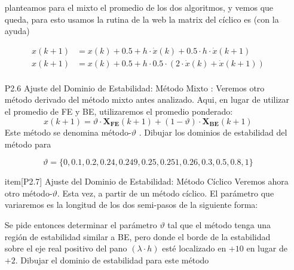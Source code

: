\documentclass{article}
\begin{document}
\begin{itemize}
planteamos para el mixto el promedio de los dos algoritmos, y vemos que queda, para esto usamos la rutina de la web
la matrix del cíclico es (con la ayuda)

\begin{align}
	x(k+1)   &=  x(k) + 0.5 + h \cdot \dot{x}(k) + 0.5 \cdot h \cdot \dot{x}(k+1) \\
	x(k+1)   &=  x(k) + 0.5 + h \cdot 0.5 \cdot (2 \cdot \dot{x}(k) +  \dot{x}(k+1)) \\
\end{align}
\item[P2.6] Ajuste del Dominio de Estabilidad: Método Mixto : Veremos otro método derivado del método mixto antes analizado. Aqui, en lugar de utilizar el promedio de FE y BE, utilizaremos el promedio ponderado:
\begin{equation}
x(k+1) = \vartheta \cdot \boldsymbol{X_{FE}}(k + 1) + (1 - \vartheta) \cdot \boldsymbol{X_{BE}}(k + 1)
\tag{P2.6a}
\end{equation}
Este método se denomina método-$\vartheta$ . Dibujar los dominios de estabilidad del método para

\begin{equation}
\vartheta = \{0, 0.1, 0.2, 0.24, 0.249, 0.25, 0.251, 0.26, 0.3, 0.5, 0.8, 1\} \tag{P2.6b}
\end{equation}

item[P2.7] Ajuste del Dominio de Estabilidad: Método Cíclico Veremos ahora otro método-$\vartheta$. Esta vez, a partir de un método cíclico. El parámetro que variaremos es la longitud de los dos semi-pasos de la siguiente forma:


Se pide entonces determinar el parámetro $\vartheta$ tal que el método tenga una región de estabilidad similar a BE, pero donde el borde de la estabilidad sobre el eje real positivo del pano $(\lambda \cdot h)$ esté localizado en $+10$ en lugar de $+2$.
Dibujar el dominio de estabilidad para este método
\end{itemize}
\end{document}

